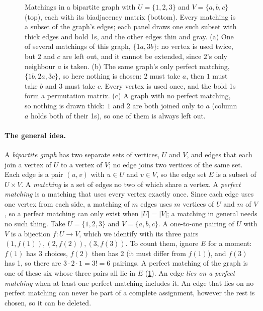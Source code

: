 \begin{figure}[H]
\caption{Matchings in a bipartite graph with $U=\{1,2,3\}$ and $V=\{a,b,c\}$ (top), each with its biadjacency
matrix (bottom). Every matching is a subset of the graph's edges; each panel draws one such subset with thick edges
and bold 1s, and the other edges thin and gray. (a) One of several matchings of this graph, $\{1a,3b\}$: no vertex is
used twice, but $2$ and $c$ are left out, and it cannot be extended, since $2$'s only neighbour $a$ is taken. (b) The
same graph's only perfect matching, $\{1b,2a,3c\}$, so here nothing is chosen: $2$ must take $a$, then $1$ must take
$b$ and $3$ must take $c$. Every vertex is used once, and the bold 1s form a permutation matrix. (c) A graph with no
perfect matching, so nothing is drawn thick: $1$ and $2$ are both joined only to $a$ (column $a$ holds both of their
1s), so one of them is always left out.}
\label{fig:matching}
\end{figure}

\paragraph{The general idea.} A \emph{bipartite graph} has two separate sets of vertices, $U$ and $V$, and edges
that each join a vertex of $U$ to a vertex of $V$; no edge joins two vertices of the same set. Each edge is a pair
$(u,v)$ with $u\in U$ and $v\in V$, so the edge set $E$ is a subset of $U\times V$. A \emph{matching} is a set of edges
no two of which share a vertex. A \emph{perfect matching} is a matching that uses every vertex exactly once. Since each
edge uses one vertex from each side, a matching of $m$ edges uses $m$ vertices of $U$ and $m$ of $V$, so a perfect
matching can only exist when $|U|=|V|$; a matching in general needs no such thing. Take $U=\{1,2,3\}$ and
$V=\{a,b,c\}$. A one-to-one pairing of $U$ with $V$ is a bijection $f\colon U\to V$, which we identify with its three
pairs $(1,f(1)),(2,f(2)),(3,f(3))$. To count them, ignore $E$ for a moment: $f(1)$ has 3 choices, $f(2)$ then has 2 (it
must differ from $f(1)$), and $f(3)$ has 1, so there are $3\cdot 2\cdot 1=3!=6$ pairings. A perfect matching of the
graph is one of these six whose three pairs all lie in $E$ (\cref{fig:matching}). An edge \emph{lies on a perfect
matching} when at least one perfect matching includes it. An edge that lies on no perfect matching can never be part
of a complete assignment, however the rest is chosen, so it can be deleted.

